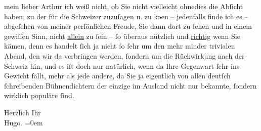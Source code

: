 \pstart{}mein lieber Arthur\pend\vspace{0.5em}
\pstart
           ich weiß nicht, ob Sie nicht vielleicht ohnedies die Abſicht haben, zu der \label{K_L02259-1v}\label{K_L02259-1} für die Schweizer zuzuſagen u. zu ko{\geminationm}en – jedenfalls finde ich es – abgeſehen von meiner
               perſönlichen Freude, Sie dann dort zu{ }ſehen und in einem gewiſſen Sinn, nicht \uline{allein} zu{ }ſein –{ }ſo überaus nützlich und \uline{richtig} wenn Sie {\pb}kämen, denn es handelt{ }ſich ja
               nicht{ }ſo{ }ſehr um den mehr minder trivialen Abend, den wir da verbringen werden,{ }ſondern um die Rückwirkung nach der Schweiz
               hin, und es iſt doch nur natürlich, wenn da Ihre Gegenwart{ }ſehr ins Gewicht fällt,
               mehr als jede andere, da Sie ja eigentlich von allen deutſch{ }ſchreibenden
               Bühnendichtern der einzige \introOben{}im Ausland\introOben{} nicht nur bekannte,{ }ſondern wirklich populäre{ }ſind.\pend
           
\pstart
           Herzlich Ihr{\\[\baselineskip]}\spacefill\mbox{Hugo.}\pend
           \leftskip=0em{}\endnumbering{}  \newcommand{\dateiname}{L02259}\newcommand{\titel}{Hugo von Hofmannsthal an Arthur Schnitzler, 30. 4. [1917]}\newcommand{\editorInnen}{Martin Anton Müller und Gerd-Hermann Susen}
